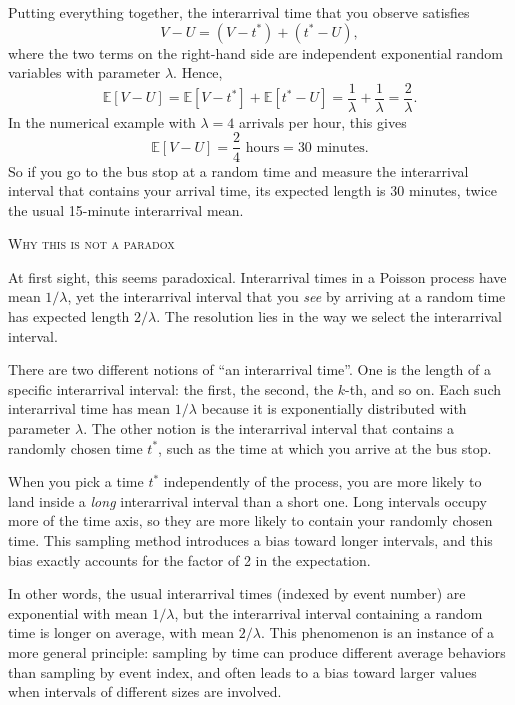 Putting everything together, the interarrival time that you observe satisfies
\[
V - U = (V - t^{\ast}) + (t^{\ast} - U),
\]
where the two terms on the right-hand side are independent exponential random variables with parameter \(\lambda\).  
Hence,
\[
\mathbb{E}[V - U]
=
\mathbb{E}[V - t^{\ast}] + \mathbb{E}[t^{\ast} - U]
=
\frac{1}{\lambda} + \frac{1}{\lambda}
=
\frac{2}{\lambda}.
\]
In the numerical example with \(\lambda = 4\) arrivals per hour, this gives
\[
\mathbb{E}[V - U] = \frac{2}{4} \text{ hours} = 30 \text{ minutes}.
\]
So if you go to the bus stop at a random time and measure the interarrival interval that contains your arrival time, its expected length is 30 minutes, twice the usual 15-minute interarrival mean.

\bigskip
\textsc{Why this is not a paradox}

At first sight, this seems paradoxical.  
Interarrival times in a Poisson process have mean \(1/\lambda\), yet the interarrival interval that you \textit{see} by arriving at a random time has expected length \(2/\lambda\).  
The resolution lies in the way we select the interarrival interval.  

There are two different notions of “an interarrival time”.  
One is the length of a specific interarrival interval: the first, the second, the \(k\)-th, and so on.  
Each such interarrival time has mean \(1/\lambda\) because it is exponentially distributed with parameter \(\lambda\).  
The other notion is the interarrival interval that contains a randomly chosen time \(t^{\ast}\), such as the time at which you arrive at the bus stop.  

When you pick a time \(t^{\ast}\) independently of the process, you are more likely to land inside a \textit{long} interarrival interval than a short one.  
Long intervals occupy more of the time axis, so they are more likely to contain your randomly chosen time.  
This sampling method introduces a bias toward longer intervals, and this bias exactly accounts for the factor of 2 in the expectation.  

In other words, the usual interarrival times (indexed by event number) are exponential with mean \(1/\lambda\), but the interarrival interval containing a random time is longer on average, with mean \(2/\lambda\).  
This phenomenon is an instance of a more general principle: sampling by time can produce different average behaviors than sampling by event index, and often leads to a bias toward larger values when intervals of different sizes are involved.

